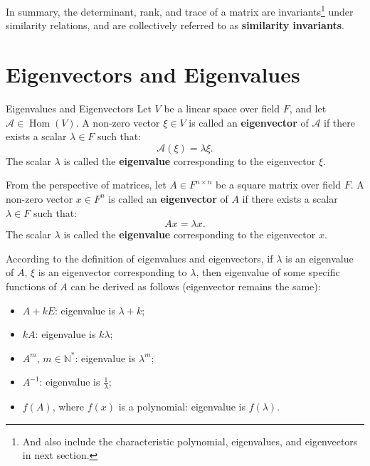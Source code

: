 \documentclass[11pt]{../../TexTemplate/elegantbook} %
\begin{document}
\vspace{0.7cm}
In summary, the determinant, rank, and trace of a matrix are invariants\footnote{
    And also include the characteristic polynomial, eigenvalues, and eigenvectors in next section.
} under similarity relations, 
and are collectively referred to as \textbf{similarity invariants}.


\section{Eigenvectors and Eigenvalues}
\begin{definition}{Eigenvalues and Eigenvectors}
    Let \( V \) be a linear space over field \( F \), 
    and let \( \mathcal{A}\in \operatorname{Hom}(V) \).
    A non-zero vector \( \xi \in V \) is called an \textbf{eigenvector} of \( \mathcal{A} \)
    if there exists a scalar \( \lambda \in F \) such that:
    \[
    \mathcal{A}(\xi) = \lambda \xi.
    \]
    The scalar \( \lambda \) is called the \textbf{eigenvalue} corresponding to the eigenvector \( \xi \).
    
    From the perspective of matrices,
    let \( A \in F^{n \times n} \) be a square matrix over field \( F \).
    A non-zero vector \( x \in F^n \) is called an \textbf{eigenvector} of \( A \)
    if there exists a scalar \( \lambda \in F \) such that:
    \[
    A x = \lambda x.
    \]
    The scalar \( \lambda \) is called the \textbf{eigenvalue} corresponding to the eigenvector \( x \).
\end{definition}

According to the definition of eigenvalues and eigenvectors,
if \( \lambda \) is an eigenvalue of \( A \), \(\xi\) is an eigenvector corresponding to \( \lambda \),
then eigenvalue of some specific functions of \( A \) can be derived as follows (eigenvector remains the same):
\begin{itemize}
    \item \(A + kE\): eigenvalue is \( \lambda + k \);
    \item \(kA\): eigenvalue is \( k\lambda \);
    \item \(A^m\), \(m \in \mathbb{N}^{*}\): eigenvalue is \( \lambda^m \);
    \item \(A^{-1}\): eigenvalue is \( \frac{1}{\lambda} \);
    \item \(f(A)\), where \(f(x)\) is a polynomial: eigenvalue is \( f(\lambda) \).
\end{itemize}
\end{document}
